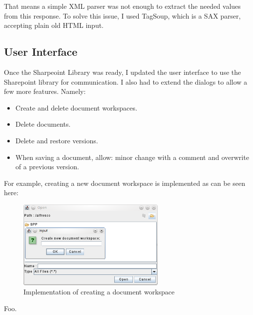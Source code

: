 That means a simple XML parser was not enough to extract the needed values from
this response. To solve this issue, I used TagSoup\cite{tagsoup}, which is a
SAX parser, accepting plain old HTML input.

\subsection{User Interface}

Once the Sharpeoint Library was ready, I updated the user interface to use the
Sharepoint library for communication. I also had to extend the dialogs to allow
a few more features. Namely:

\begin{itemize}
\item Create and delete document workspaces.
\item Delete documents.
\item Delete and restore versions.
\item When saving a document, allow: minor change with a comment and overwrite of a previous version.
\end{itemize}

For example, creating a new document workspace is implemented as can be seen
here:

\begin{figure}[H]
\centering
\includegraphics[width=275px,keepaspectratio]{implementation-createdws.png}
\caption{Implementation of creating a document workspace}
\end{figure}

Foo.
